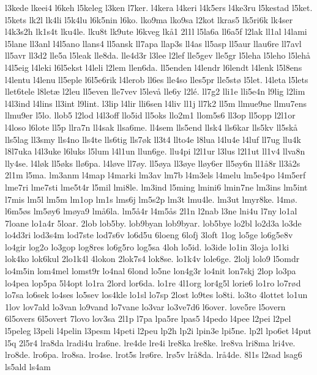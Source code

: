 l3kede
lkeei4
l6keh
l5keleg
l3ken
l7ker.
l4kera
l4keri
l4k5ers
l4ke3ru
l5kestad
l5ket.
l5kets
lk2l
lk4li
l5k4lu
l6k5nin
l6ko.
lko9ma
lko9sa
l2kot
lkras5
lk5ri6k
lk4ser
l4k3s2h
lk1s4t
lku4le.
lku8t
lk9ute
l6kveg
lk^^e51
2l1l
l5la6a
ll6a5f
l2lak
ll1al
l4lami
l5lane
ll3anl
l4l5ano
llans4
ll5ansk
ll7apa
llap3s
ll4as
ll5asp
ll5aur
llau6re
ll7avl
ll5avr
ll3d2
lle5a
l5leak
lle8da.
lle4d3r
l3lee
l2lef
lle5gev
lle5gr
l5leha
l5leho
l5leh^^e5
l4l5eig
l4leki
l6l5ekst
l4leli
l2lem
llen6da.
ll5enden
l4lendr
l6lendt
l4lenk
l5l8ens
l4lentu
l4lenu
ll5eple
l6l5e6rik
l4lerob
ll6es
lle4so
lles5pr
lle5st^^f8
l5let.
l4leta
l5lets
llet6tele
l8let^^e6
l2leu
ll5even
lle7vev
l5lev^^e5
lle6y
l2l^^e9.
ll7g2
lli1e
lli5e4n
l9lig
l2lim
l4l3ind
l4lins
ll3int
l9lint.
l3lip
l4lir
lli6sen
l4liv
ll1j
ll7k2
ll5m
llmue9ne
llmu7ens
llmu9er
l5lo.
llob5
l2lod
l4l3off
llo5id
ll5oks
llo2m1
llom5s6
ll3op
ll5opp
l2l1or
l4loso
l6lote
ll5p
llra7n
ll4sak
llsa6me.
ll4sem
lls5end
llsk4
lls6kar
lls5kv
ll5sk^^e5
lls5lag
ll3smy
lls4no
lls4te
lls6tig
lls7^^f8k
ll3t4
llto4e
l8lua
l4lu4e
l4luf
ll7ug
llu4k
l8l7uka
l4l3uke
l6luks
l5lum
l4l1un
llun6ge.
llu4pi
l2l1ur
l3lus
l2l1ut
ll1v4
llva8n
lly4se.
l4l^^f8k
ll5^^f8ks
ll^^f86pa.
l4l^^f8ve
ll7^^f8y.
ll5^^f8ya
ll3^^f8ye
ll^^f8y6er
ll5^^f8y6n
ll1^^e58r
ll3^^e52s
2l1m
l5ma.
lm3anm
l4map
l4marki
lm3av
lm7b
l4m3els
l4melu
lm5e4po
l4m5erf
lme7ri
lme7sti
lme5t4r
l5mil
lmi8le.
lm3ind
l5ming
lmini6
lmin7ne
lm3ins
lm5int
l7mis
lm5l
lm5m
lm1op
lm1s
lms6j
lm5s2p
lm3t
lmu4le.
lm3ut
lmyr8ke.
l4m^^f8.
l6m5^^f8s
lm5^^f8y6
lm^^f8ya9
lm^^e56la.
lm5^^e54r
l4m5^^e5s
2l1n
l2nab
l3ne
lni4u
l7ny
lo1al
7loane
lo1a4r
5loar.
2lob
lob5by.
lob9byan
lob9byar.
lob5bye
lo2bl
lo2d3a
lo3de
lo4d3ri
lod3s4m
lod7ste
lod7s6v
lo6d5u
6loeng
6lofj
3loft
1log
lo5ge
lo6g5e8v
lo4gir
log2o
lo3gop
log8res
lo6g5ro
log5sa
4loh
lo5id.
lo3ide
lo1in
3loja
lo1ki
lok4ko
lok6kul
2lo1k4l
4lokon
2lok7s4
lok8se.
lo1k4v
lole6ge.
2lolj
lolo9
l5omdr
lo4m5in
lom4mel
lomst9r
lo4nal
6lond
lo5ne
lon4g3r
lo4nit
lon7skj
2lop
lo3pa
lo4pea
lop5pa
5l4opt
lo1ra
2lord
lor6da.
lo1re
4l1org
lor4g5l
lorie6
lo1ro
lo7r^^f8d
lo7sa
lo6sek
lo4ses
lo5sev
los4kle
lo1sl
lo7sp
2lost
lo9tes
lo8ti.
lo3to
4lottet
lo1un
1lov
lov7ald
lo3van
lo9vand
lo7vane
lo3var
lo3ve7d6
l6over.
love5re
l5overn
6l5overs
6l5overt
7lovo
lov3sa
2l1p
l7pa
lpa5re
lpas5
l4pedo
l4pee
l2pei
l2pel
l5peleg
l3peli
l4pelin
l3pesm
l4peti
l2peu
lp2h
lp2i
lpin3e
lpi5ne.
lp2l
lpo6et
l4put
l5q
2l5r4
lra8da
lradi4u
lra6ne.
lre4de
lre4i
lre8ka
lre8ke.
lre8va
lri8ma
lri4ve.
lro8de.
lro6pa.
lro8sa.
lro4se.
lrot5s
lr^^f86re.
lr^^f85v
lr^^e58da.
lr^^e54de.
8l1s
l2sad
lsag6
ls5ald
ls4am
